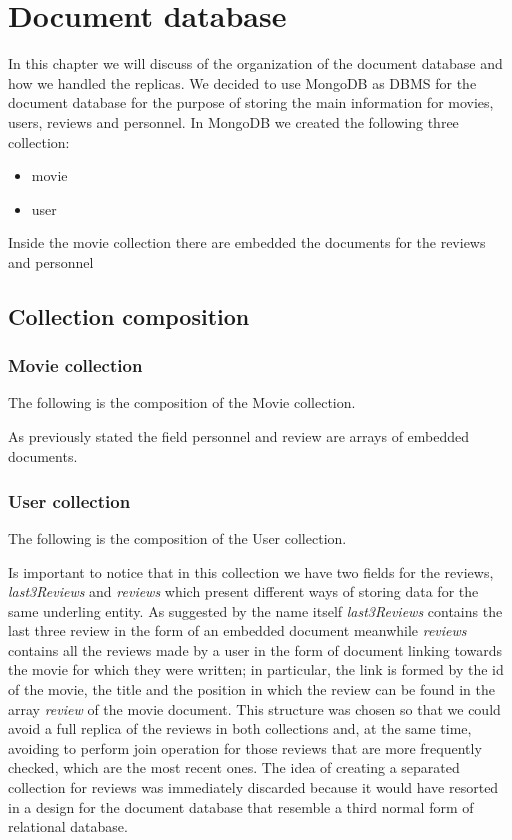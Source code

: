 

\chapter{Document database}
\justifying
In this chapter we will discuss of the organization of the document database and how we handled the replicas. We decided to use MongoDB as DBMS for the document database for the purpose of storing the main information for movies, users, reviews and personnel. In MongoDB we created the following three collection: 
\begin{itemize}
	\item movie
	\item user
\end{itemize}
Inside the movie collection there are embedded the documents for the reviews and personnel
\section{Collection composition}
\subsection{Movie collection}
The following is the composition of the Movie collection.

As previously stated the field personnel and review are arrays of embedded documents.
\paragraph{}
\subsection{User collection}
The following is the composition of the User collection.

Is important to notice that in this collection we have two fields for the reviews, \emph{last3Reviews} and \emph{reviews} which present different ways of storing data for the same underling entity. As suggested by the name itself \emph{last3Reviews} contains the last three review in the form of an embedded document meanwhile \emph{reviews} contains all the reviews made by a user in the form of document linking towards the movie for which they were written; in particular, the link is formed by the id of the movie, the title and the position in which the review can be found in the array \emph{review} of the movie document. This structure was chosen so that we could avoid a full replica of the reviews in both collections and, at the same time, avoiding to perform join operation for those reviews that are more frequently checked, which are the most recent ones. The idea of creating a separated collection for reviews was immediately discarded because it would have resorted in a design for the document database that resemble a third normal form of relational database.

